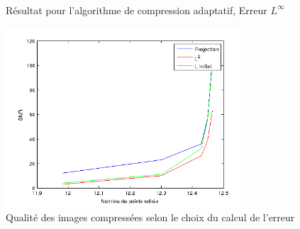\documentclass{report}
\begin{document}
\begin{figure}[ht!]
\begin{center}
{        }\\ %
    \end{center}
    \caption{%
        Résultat pour l'algorithme de compression adaptatif, Erreur $L^\infty$
    }%
   \label{fig:subfigures}
\end{figure}

\clearpage


\begin{figure}[ht]
\centering
\includegraphics[width=0.8\textwidth]{qualiteErr.png}
\caption{Qualité des images compressées selon le choix du calcul de l'erreur}
\end{figure}
\end{document}
